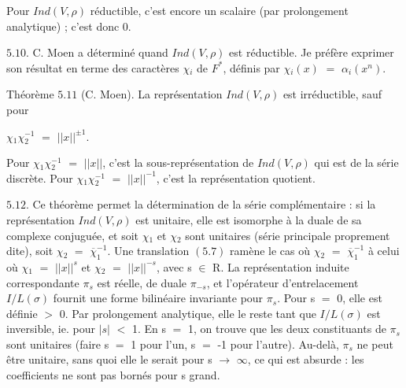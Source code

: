 \documentclass[10pt,a4paper]{article}
\begin{document}
\clearpage
{}
\label{d035-physical-025}
\par Pour $Ind(V,\rho{})$ réductible, c'est encore un scalaire (par prolongement analytique) ; c'est donc 0.\par
\par $5.10$. C. Moen a déterminé quand $Ind(V,\rho{})$ est réductible. Je préfère exprimer son résultat en terme des caractères $\chi{}_i$ de $F^*$, définis par $\chi{}_i(x)$ $=$ $\alpha{}_i(x^n)$.\par
\par Théorème $5.11$ (C. Moen). La représentation $Ind(V,\rho{})$ est irréductible, sauf pour\par
\par\smallskip\begin{center}\begin{minipage}{0.96\textwidth}\centering
$\chi{}_1\chi{}_2^{-1}$ $=$ $||x||^{\pm{}1}$.
\end{minipage}\end{center}\smallskip
\par Pour $\chi{}_1\chi{}_2^{-1}$ $=$ $||x||$, c'est la sous-représentation de $Ind(V,\rho{})$ qui est de la série discrète. Pour $\chi{}_1\chi{}_2^{-1}$ $=$ $||x||^{-1}$, c'est la représentation quotient.\par
\par $5.12$. Ce théorème permet la détermination de la série complémentaire : si la représentation $Ind(V,\rho{})$ est unitaire, elle est isomorphe à la duale de sa complexe conjuguée, et soit $\chi{}_1$ et $\chi{}_2$ sont unitaires (série principale proprement dite), soit $\chi{}_2$ $=$ $\overline{\chi{}}_1^{-1}$. Une translation $(5.7)$ ramène le cas où $\chi{}_2$ $=$ $\overline{\chi{}}_1^{-1}$ à celui où $\chi{}_1$ $=$ $||x||^s$ et $\chi{}_2$ $=$ $||x||^{-s}$, avec s $\in{}$ R. La représentation induite correspondante $\pi{}_s$ est réelle, de duale $\pi{}_{-s}$, et l'opérateur d'entrelacement $I/L(\sigma{})$ fournit une forme bilinéaire invariante pour $\pi{}_s$. Pour s $=$ 0, elle est définie $>$ 0. Par prolongement analytique, elle le reste tant que $I/L(\sigma{})$ est inversible, ie. pour $|s|$ $<$ 1. En s $=$ 1, on trouve que les deux constituants de $\pi{}_s$ sont unitaires (faire s $=$ 1 pour l'un, s $=$ -1 pour l'autre). Au-delà, $\pi{}_s$ ne peut être unitaire, sans quoi elle le serait pour s $\to{}$ $\infty{}$, ce qui est absurde : les coefficients ne sont pas bornés pour s grand.\par
\end{document}
